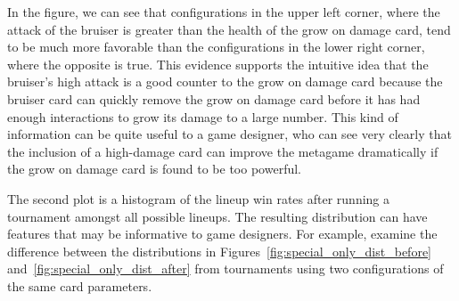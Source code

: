 \documentclass[letterpaper]{article} %
\begin{document}
In the figure, we can see that configurations in the upper left corner, where the attack of the bruiser is greater than the health of the grow on damage card, tend to be much more favorable than the configurations in the lower right corner, where the opposite is true. This evidence supports the intuitive idea that the bruiser's high attack is a good counter to the grow on damage card because the bruiser card can quickly remove the grow on damage card before it has had enough interactions to grow its damage to a large number. This kind of information can be quite useful to a game designer, who can see very clearly that the inclusion of a high-damage card can improve the metagame dramatically if the grow on damage card is found to be too powerful.

The second plot is a histogram of the lineup win rates after running a tournament amongst all possible lineups. %
The resulting distribution can have features that may be informative to %
game designers. For example, examine the difference between the distributions %
in Figures~\ref{fig:special_only_dist_before} and~\ref{fig:special_only_dist_after} from tournaments using two configurations of the same card parameters. 
\end{document}
